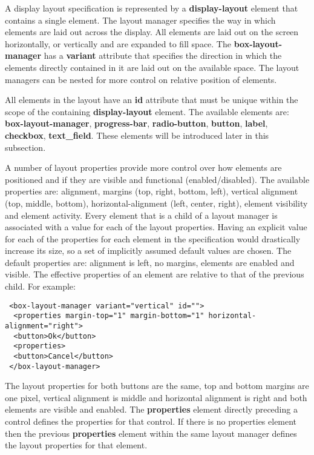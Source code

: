 \documentclass{article}
\begin{document}
   A display layout specification is represented by a \textbf{display-layout}
   element that contains a single  element. The layout
   manager specifies the way in which elements are laid out across the display.
   All elements are laid out on the screen horizontally, or vertically and are
   expanded to fill space. The \textbf{box-layout-manager} has a
   \textbf{variant} attribute that specifies the direction in which the
   elements directly contained in it are laid out on the available space. The
   layout managers can be nested for more control on relative position of
   elements.

   All elements in the layout have an \textbf{id} attribute that must be unique
   within the scope of the containing \textbf{display-layout} element. The
   available elements are: \textbf{box-layout-manager}, \textbf{progress-bar},
   \textbf{radio-button}, \textbf{button}, \textbf{label}, \textbf{checkbox},
   \textbf{text\_field}.  These elements will be introduced later in this
   subsection.

   A number of layout properties provide more control over how elements are
   positioned and if they are visible and functional (enabled/disabled). The
   available properties are: alignment, margins (top, right, bottom, left),
   vertical alignment (top, middle, bottom), horizontal-alignment (left,
   center, right), element visibility and element activity. Every element that
   is a child of a layout manager is associated with a value for each of the
   layout properties.  Having an explicit value for each of the properties for
   each element in the specification would drastically increase its size, so a
   set of implicitly assumed default values are chosen.  The default properties
   are: alignment is left, no margins, elements are enabled and visible. The
   effective properties of an element are relative to that of the previous
   child. For example:

    \begin{verbatim}
 <box-layout-manager variant="vertical" id="">
  <properties margin-top="1" margin-bottom="1" horizontal-alignment="right">
  <button>Ok</button>
  <properties>
  <button>Cancel</button>
 </box-layout-manager>\end{verbatim}

   The layout properties for both buttons are the same, top and bottom margins
   are one pixel, vertical alignment is middle and horizontal alignment is right
   and both elements are visible and enabled. The \textbf{properties} element
   directly preceding a control defines the properties for that control. If
   there is no properties element then the previous \textbf{properties} element
   within the same layout manager defines the layout properties for that
   element.
\end{document}
